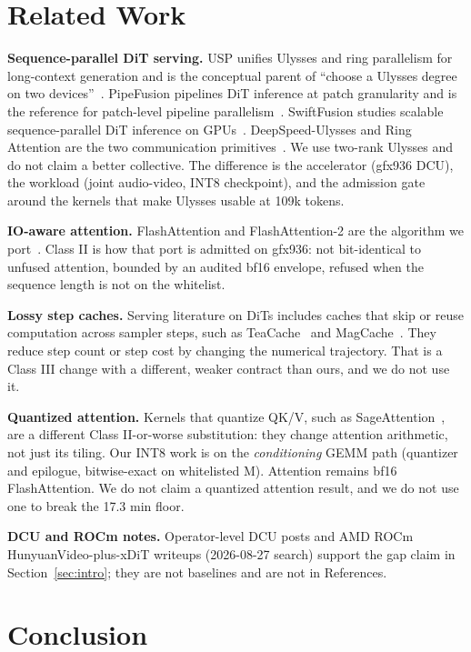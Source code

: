 \documentclass[11pt]{article}
\begin{document}
\section{Related Work}
\label{sec:related}

\textbf{Sequence-parallel DiT serving.} USP unifies Ulysses and ring parallelism for long-context generation and is the conceptual parent of ``choose a Ulysses degree on two devices''~\cite{1}. PipeFusion pipelines DiT inference at patch granularity and is the reference for patch-level pipeline parallelism~\cite{2}. SwiftFusion studies scalable sequence-parallel DiT inference on GPUs~\cite{3}. DeepSpeed-Ulysses and Ring Attention are the two communication primitives~\cite{6,7}. We use two-rank Ulysses and do not claim a better collective. The difference is the accelerator (gfx936 DCU), the workload (joint audio-video, INT8 checkpoint), and the admission gate around the kernels that make Ulysses usable at 109k tokens.

\textbf{IO-aware attention.} FlashAttention and FlashAttention-2 are the algorithm we port~\cite{4,5}. Class II is how that port is admitted on gfx936: not bit-identical to unfused attention, bounded by an audited bf16 envelope, refused when the sequence length is not on the whitelist.

\textbf{Lossy step caches.} Serving literature on DiTs includes caches that skip or reuse computation across sampler steps, such as TeaCache~\cite{8} and MagCache~\cite{9}. They reduce step count or step cost by changing the numerical trajectory. That is a Class III change with a different, weaker contract than ours, and we do not use it.

\textbf{Quantized attention.} Kernels that quantize QK/V, such as SageAttention~\cite{10}, are a different Class II-or-worse substitution: they change attention arithmetic, not just its tiling. Our INT8 work is on the \emph{conditioning} GEMM path (quantizer and epilogue, bitwise-exact on whitelisted M). Attention remains bf16 FlashAttention. We do not claim a quantized attention result, and we do not use one to break the 17.3 min floor.

\textbf{DCU and ROCm notes.} Operator-level DCU posts and AMD ROCm HunyuanVideo-plus-xDiT writeups (2026-08-27 search) support the gap claim in Section~\ref{sec:intro}; they are not baselines and are not in References.

\section{Conclusion}
\label{sec:conclusion}
\end{document}

